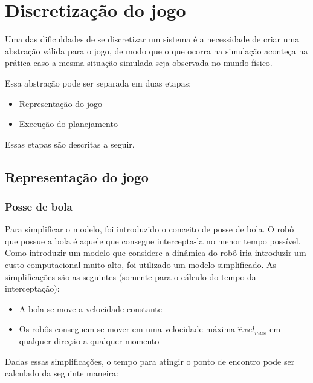 \section{Discretização do jogo}\label{sec:mapeamento}

Uma das dificuldades de se discretizar um sistema é a necessidade de criar uma
abstração válida para o jogo, de modo que o que ocorra na simulação aconteça na
prática caso a mesma situação simulada seja observada no mundo físico.

Essa abstração pode ser separada em duas etapas:

\begin{itemize}
  \item Representação do jogo
  \item Execução do planejamento
\end{itemize}

Essas etapas são descritas a seguir.

\subsection{Representação do jogo}\label{subsec:repres_jogo}

\subsubsection{Posse de bola}

Para simplificar o modelo, foi introduzido o conceito de posse
de bola. O robô que possue a bola é aquele que consegue intercepta-la
no menor tempo possível. Como introduzir um modelo que considere
a dinâmica do robô iria introduzir um custo computacional muito alto,
foi utilizado um modelo simplificado. As simplificações são as
seguintes (somente para o cálculo do tempo da interceptação):

\begin{itemize}
  \item A bola se move a velocidade constante
  \item Os robôs conseguem se mover em uma velocidade máxima
        $\hat{r}.vel_{max}$ em qualquer direção a qualquer momento
\end{itemize}

Dadas essas simplificações, o tempo para atingir o ponto de
encontro pode ser calculado da seguinte maneira: 

